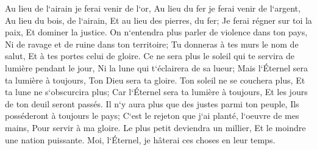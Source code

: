 \verse Au lieu de l`airain je ferai venir de l`or, Au lieu du fer je ferai venir de l`argent, Au lieu du bois, de l`airain, Et au lieu des pierres, du fer; Je ferai régner sur toi la paix, Et dominer la justice. 
\verse On n`entendra plus parler de violence dans ton pays, Ni de ravage et de ruine dans ton territoire; Tu donneras à tes murs le nom de salut, Et à tes portes celui de gloire. 
\verse Ce ne sera plus le soleil qui te servira de lumière pendant le jour, Ni la lune qui t`éclairera de sa lueur; Mais l`Éternel sera ta lumière à toujours, Ton Dieu sera ta gloire. 
\verse Ton soleil ne se couchera plus, Et ta lune ne s`obscurcira plus; Car l`Éternel sera ta lumière à toujours, Et les jours de ton deuil seront passés. 
\verse Il n`y aura plus que des justes parmi ton peuple, Ils posséderont à toujours le pays; C`est le rejeton que j`ai planté, l`oeuvre de mes mains, Pour servir à ma gloire. 
\verse Le plus petit deviendra un millier, Et le moindre une nation puissante. Moi, l`Éternel, je hâterai ces choses en leur temps. 

